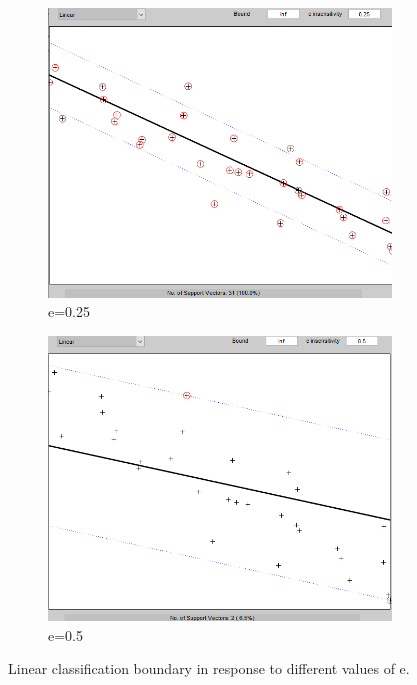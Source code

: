 \documentclass{article}
\begin{document}
        \begin{figure}[h]
             \centering
             \hspace{0.05\textwidth}
             \begin{subfigure}[b]{0.4\textwidth}
                 \centering
                 \includegraphics[width=\textwidth]{Assignment 2/figures/1_1/linear_b_inf_e_0_25.png}
                 \caption{e=0.25}
                 \label{fig:linear_small_e}
             \end{subfigure}
             \hfill
             \begin{subfigure}[b]{0.4\textwidth}
                 \centering
                 \includegraphics[width=\textwidth]{Assignment 2/figures/1_1/linear_b_inf_e_0_5.png}
                 \caption{e=0.5}
                 \label{fig:linear_large_e}
             \end{subfigure}
             \hspace{0.05\textwidth}
            \caption{Linear classification boundary in response to different values of e. }
            \label{fig:e-bounds}
        \end{figure}
        
\end{document}
